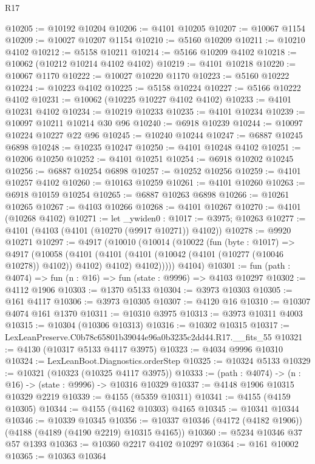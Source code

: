 \begin{lexlean}{R17}
\begin{coremodule}
@10205 := @10192 @10204
@10206 := @4101 @10205
@10207 := @10067 @1154
@10209 := @10027 @10207 @1154
@10210 := @5160 @10209
@10211 := @10210 @4102
@10212 := @5158 @10211
@10214 := @5166 @10209 @4102
@10218 := @10062 (@10212 @10214 @4102 @4102)
@10219 := @4101 @10218
@10220 := @10067 @1170
@10222 := @10027 @10220 @1170
@10223 := @5160 @10222
@10224 := @10223 @4102
@10225 := @5158 @10224
@10227 := @5166 @10222 @4102
@10231 := @10062 (@10225 @10227 @4102 @4102)
@10233 := @4101 @10231 @4102
@10234 := @10219 @10233
@10235 := @4101 @10234
@10239 := @10097 @10211 @10214 @30 @96
@10240 := @6918 @10239
@10244 := @10097 @10224 @10227 @22 @96
@10245 := @10240 @10244
@10247 := @6887 @10245 @6898
@10248 := @10235 @10247
@10250 := @4101 @10248 @4102
@10251 := @10206 @10250
@10252 := @4101 @10251
@10254 := @6918 @10202 @10245
@10256 := @6887 @10254 @6898
@10257 := @10252 @10256
@10259 := @4101 @10257 @4102
@10260 := @10163 @10259
@10261 := @4101 @10260
@10263 := @6918 @10159 @10254
@10265 := @6887 @10263 @6898
@10266 := @10261 @10265
@10267 := @4103 @10266
@10268 := @4101 @10267
@10270 := @4101 (@10268 @4102)
@10271 := let _ywiden0 : @1017 := @3975; @10263
@10277 := @4101 (@4103 (@4101 (@10270 (@9917 @10271)) @4102))
@10278 := @9920 @10271
@10297 := @4917
    (@10010
      (@10014
        (@10022
          (fun (byte : @1017) =>
          @4917
            (@10058
              (@4101
                (@4101 (@4101 (@10042 (@4101 (@10277 (@10046 @10278)) @4102)) @4102) @4102)
                @4102)))))
      @4104)
@10301 := fun (path : @4074) => fun (n : @16) => fun (state : @9996) => @4103 @10297
@10302 := @4112 @1906
@10303 := @1370 @5133
@10304 := @3973 @10303
@10305 := @161 @4117
@10306 := @3973 @10305
@10307 := @4120 @16
@10310 := @10307 @4074 @161 @1370
@10311 := @10310 @3975
@10313 := @3973 @10311 @4003
@10315 := @10304 (@10306 @10313)
@10316 := @10302 @10315
@10317 := LexLeanPreserve.C0b78c65801b39044e96a0b3235c2dd44.R17.__fits_55
@10321 := @4130 (@10317 @5133 @4117 @3975)
@10323 := @4034 @9996 @10310
@10324 := LexLeanBoot.Diagnostics.orderStep
@10325 := @10324 @5133
@10329 := @10321 (@10323 (@10325 @4117 @3975))
@10333 := (path : @4074) -> (n : @16) -> (state : @9996) -> @10316 @10329
@10337 := @4148 @1906 @10315 @10329 @2219
@10339 := @4155 (@5359 @10311)
@10341 := @4155 (@4159 @10305)
@10344 := @4155 (@4162 @10303) @4165
@10345 := @10341 @10344
@10346 := @10339 @10345
@10356 := @10337 @10346 (@4172 (@4182 @1906)) (@4188 (@4189 (@4190 @2219) @10315 @4165))
@10360 := @5234 @10346 @37 @57 @1393
@10363 := @10360 @2217 @4102 @10297
@10364 := @161 @10002
@10365 := @10363 @10364

\end{coremodule}
\end{lexlean}

